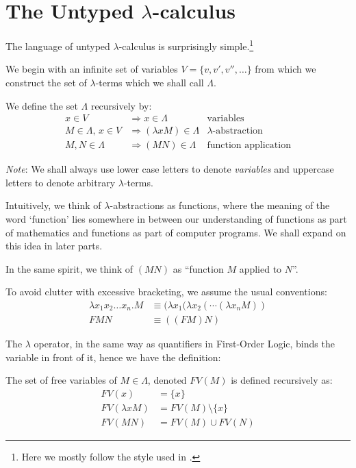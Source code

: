 \section{The Untyped $\lambda$-calculus}

The language of untyped $\lambda$-calculus is surprisingly simple.\footnote{Here we mostly follow the style used in \smartcite{introtolambda}.}

We begin with an infinite set of variables $V = \{v, v', v'', \ldots\}$ from
which we construct the set of $\lambda$-terms which we shall call $\Lambda$.

\begin{definition}\label{def:untyped-lambda-calc}
We define the set $\Lambda$ recursively by:
\begin{align*}
    x \in V & \Rightarrow x \in \Lambda &
        \text{variables} \\
    M \in \Lambda,\, x \in V & \Rightarrow (\lambda x M) \in \Lambda &
        \text{$\lambda$-abstraction} \\
    M, N \in \Lambda & \Rightarrow (M N) \in \Lambda &
        \text{function application}
\end{align*}
\end{definition}

\emph{Note}: We shall always use lower case letters to denote \emph{variables} and
uppercase letters to denote arbitrary $\lambda$-terms.

Intuitively, we think of $\lambda$-abstractions as functions, where the meaning
of the word `function' lies somewhere in between our understanding of functions as
part of mathematics and functions as part of computer programs. We shall expand
on this idea in later parts.

In the same spirit, we think of $(M N)$ as ``function $M$ applied to $N$''.

To avoid clutter with excessive bracketing, we assume the usual conventions:
\begin{align*}
    \lambda x_1 x_2 \ldots x_n . M &\equiv
        (\lambda x_1 (\lambda x_2 (\cdots (\lambda x_n M)) \\
    F M N &\equiv ((FM)N)
\end{align*}

The $\lambda$ operator, in the same way as quantifiers in First-Order Logic,
binds the variable in front of it, hence we have the definition:
\begin{definition}
    The set of free variables of $M \in \Lambda$, denoted $FV(M)$ is defined
    recursively as:
        \begin{align*}
            FV(x) &= \{x\} \\
            FV(\lambda x M) &= FV(M) \setminus \{x\} \\
            FV(M N) &= FV(M) \cup FV(N)
        \end{align*}
\end{definition}


